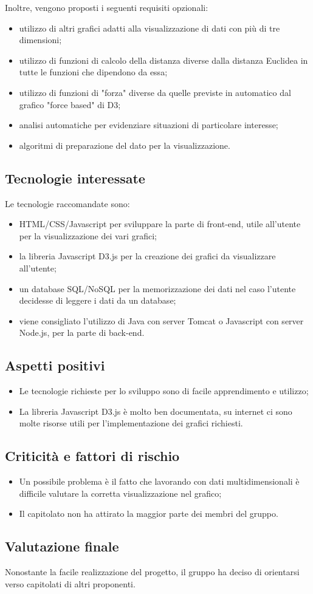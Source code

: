 Inoltre, vengono proposti i seguenti requisiti opzionali:
\begin{itemize}
\item utilizzo di altri grafici adatti alla visualizzazione di dati con più di tre dimensioni;
\item utilizzo di funzioni di calcolo della distanza diverse dalla distanza Euclidea in tutte le funzioni che dipendono da essa;
\item utilizzo di funzioni di "forza" diverse da quelle previste in automatico dal grafico "force based" di D3;
\item analisi automatiche per evidenziare situazioni di particolare interesse;
\item algoritmi di preparazione del dato per la visualizzazione.
\end{itemize}

\subsection{Tecnologie interessate}
Le tecnologie raccomandate sono:
\begin{itemize}
\item HTML/CSS/Javascript per sviluppare la parte di front-end, utile all'utente per la visualizzazione dei vari grafici;
\item la libreria Javascript D3.js per la creazione dei grafici da visualizzare all'utente;
\item un database SQL/NoSQL per la memorizzazione dei dati nel caso l'utente decidesse di leggere i dati da un database;
\item viene consigliato l’utilizzo di Java con server Tomcat o Javascript con server Node.js, per la parte di back-end.
\end{itemize}

\subsection{Aspetti positivi}
\begin{itemize}
\item Le tecnologie richieste per lo sviluppo sono di facile apprendimento e utilizzo;
\item La libreria Javascript D3.js è molto ben documentata, su internet ci sono molte risorse utili per l'implementazione dei grafici richiesti.
\end{itemize}

\subsection{Criticità e fattori di rischio}
\begin{itemize}
\item Un possibile problema è il fatto che lavorando con dati multidimensionali è difficile valutare la corretta visualizzazione nel grafico;
\item Il capitolato non ha attirato la maggior parte dei membri del gruppo.
\end{itemize}

\subsection{Valutazione finale}
Nonostante la facile realizzazione del progetto, il gruppo ha deciso di orientarsi verso capitolati di altri proponenti.